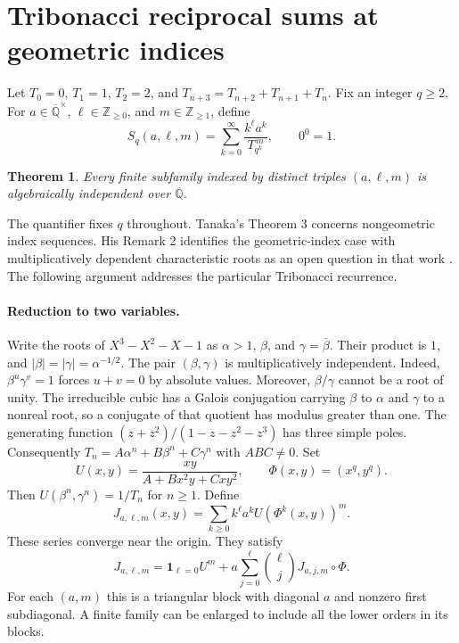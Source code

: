 \documentclass[11pt,a4paper]{article}
\newtheorem{theorem}{Theorem}[section]
\theoremstyle{definition}
\theoremstyle{remark}
\newcommand{\K}{\overline{\mathbb Q}}
\numberwithin{equation}{section}
\begin{document}
\section{Tribonacci reciprocal sums at geometric indices}
\label{sec:tribonacci}
Let $T_0=0$, $T_1=1$, $T_2=2$, and $T_{n+3}=T_{n+2}+T_{n+1}+T_n$.
Fix an integer $q\ge2$. For $a\in\overline{\mathbb Q}^{\times}$,
$\ell\in\mathbb Z_{\ge0}$, and $m\in\mathbb Z_{\ge1}$, define
\[
 S_q(a,\ell,m)=\sum_{k=0}^{\infty}\frac{k^\ell a^k}{T_{q^k}^{\,m}},
 \qquad 0^0=1 .
\]
\begin{theorem}\label{thm:tri}Every finite subfamily indexed by distinct triples $(a,\ell,m)$ is algebraically independent over $\K$.\end{theorem} The quantifier fixes $q$ throughout.
Tanaka's Theorem 3 concerns nongeometric index sequences. His Remark 2 identifies the geometric-index case with multiplicatively dependent characteristic roots as an open question in that work \cite{TanakaGeom}. The following argument addresses the particular Tribonacci recurrence.

\paragraph{Reduction to two variables.}
Write the roots of $X^3-X^2-X-1$ as $\alpha>1$, $\beta$, and $\gamma=\overline\beta$. Their product is $1$, and $|\beta|=|\gamma|=\alpha^{-1/2}$. The pair $(\beta,\gamma)$ is multiplicatively independent. Indeed, $\beta^u\gamma^v=1$ forces $u+v=0$ by absolute values. Moreover, $\beta/\gamma$ cannot be a root of unity. The irreducible cubic has a Galois conjugation carrying $\beta$ to $\alpha$ and $\gamma$ to a nonreal root, so a conjugate of that quotient has modulus greater than one.
The generating function $(z+z^2)/(1-z-z^2-z^3)$ has three simple poles. Consequently $T_n=A\alpha^n+B\beta^n+C\gamma^n$ with $ABC\ne0$. Set
\[
 U(x,y)=\frac{xy}{A+Bx^2y+Cxy^2},\qquad
 \Phi(x,y)=(x^q,y^q).
\]
Then $U(\beta^n,\gamma^n)=1/T_n$ for $n\ge1$. Define
\[
 J_{a,\ell,m}(x,y)=\sum_{k\ge0}k^\ell a^k U(\Phi^k(x,y))^m.
\]
These series converge near the origin. They satisfy
\[
 J_{a,\ell,m}=\mathbf 1_{\ell=0} U^m+
 a\sum_{j=0}^\ell \binom{\ell}{j} J_{a,j,m}\circ\Phi .
\]
For each $(a,m)$ this is a triangular block with diagonal $a$ and nonzero first subdiagonal. A finite family can be enlarged to include all the lower orders in its blocks.
\end{document}
